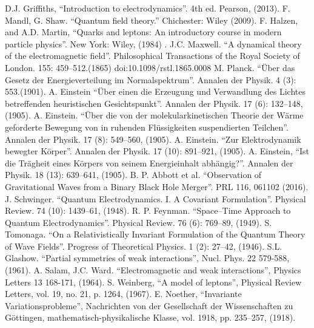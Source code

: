 \documentclass[print]{nuthesis}
\begin{document}

\nocite{*}
\begin{thebibliography}{200}
 D.J. Griffiths, ``Introduction to electrodynamics''. 4th ed. Pearson, (2013).
 F. Mandl, G. Shaw. ``Quantum field theory.'' Chichester: Wiley (2009).
 F. Halzen, and A.D. Martin, ``Quarks and leptons: An introductory course in modern particle physics''. New York: Wiley, (1984) .
 J.C. Maxwell. ``A dynamical theory of the electromagnetic field''. Philosophical Transactions of the Royal Society of London. 155: 459–512.(1865) doi:10.1098/rstl.1865.0008
 M. Planck. ``Über das Gesetz der Energieverteilung im Normalspektrum''. Annalen der Physik. 4 (3): 553.(1901).
 A. Einstein ``Über einen die Erzeugung und Verwandlung des Lichtes betreffenden heuristischen Gesichtspunkt''. Annalen der Physik. 17 (6): 132–148, (1905).
 A. Einstein. ``Über die von der molekularkinetischen Theorie der Wärme geforderte Bewegung von in ruhenden Flüssigkeiten suspendierten Teilchen''. Annalen der Physik. 17 (8): 549–560, (1905).
 A. Einstein. ``Zur Elektrodynamik bewegter Körper''. Annalen der Physik. 17 (10): 891–921, (1905).
 A. Einstein, ``Ist die Trägheit eines Körpers von seinem Energieinhalt abhängig?''. Annalen der Physik. 18 (13): 639–641, (1905).   
 B. P. Abbott et al. ``Observation of Gravitational Waves from a Binary Black Hole Merger''. PRL 116, 061102 (2016).
J. Schwinger. ``Quantum Electrodynamics. I. A Covariant Formulation''. Physical Review. 74 (10): 1439–61, (1948). 
R. P. Feynman. ``Space–Time Approach to Quantum Electrodynamics''. Physical Review. 76 (6): 769–89, (1949).
 S. Tomonaga. ``On a Relativistically Invariant Formulation of the Quantum Theory of Wave Fields''. Progress of Theoretical Physics. 1 (2): 27–42, (1946).
 S.L. Glashow. ``Partial symmetries of weak interactions'', Nucl. Phys. 22 579-588, (1961).
 A. Salam, J.C. Ward. ``Electromagnetic and weak interactions'', Physics Letters 13 168-171, (1964).
 S. Weinberg, ``A model of leptons'', Physical Review Letters, vol. 19, no. 21, p. 1264, (1967).
  E. Noether, ``Invariante Variationsprobleme'', Nachrichten von der Gesellschaft der Wissenschaften zu Göttingen, mathematisch-physikalische Klasse, vol. 1918, pp. 235–257, (1918).

\end{thebibliography}
\end{document}
